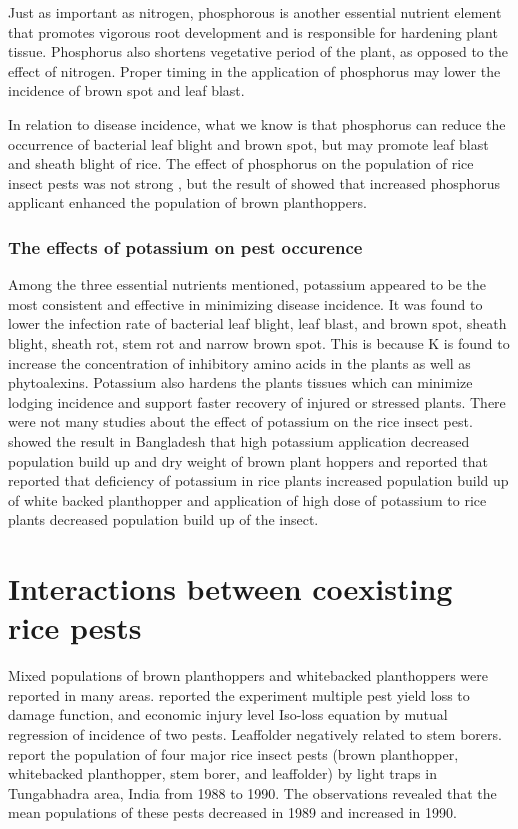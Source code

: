 \documentclass[12pt, oneside]{report}
\begin{document}
Just as important as nitrogen, phosphorous is another essential nutrient element that promotes vigorous root development and is responsible for hardening plant tissue. Phosphorus also shortens vegetative period of the plant, as opposed to the effect of nitrogen. Proper timing in the application of phosphorus may lower the incidence of brown spot and leaf blast. 

In relation to disease incidence, what we know is that phosphorus can reduce the occurrence of bacterial leaf blight and brown spot, but may promote leaf blast and sheath blight of rice. The effect of phosphorus on the population of rice insect pests was not strong \citep{chau2003impacts, rashid2014effect}, but the result of \cite{rashid2014effect} showed that increased phosphorus applicant enhanced the population of brown planthoppers.

\subsubsection{The effects of potassium on pest occurence}

Among the three essential nutrients mentioned, potassium appeared to be the most consistent and effective in minimizing disease incidence. It was found to lower the infection rate of bacterial leaf blight, leaf blast, and brown spot, sheath blight, sheath rot, stem rot and narrow brown spot. This is because K is found to increase the concentration of inhibitory amino acids in the plants as well as phytoalexins. Potassium also hardens the plants tissues which can minimize lodging incidence and support faster recovery of injured or stressed plants. There were not many studies about the effect of potassium on the rice insect pest. \cite{rashid2014effect} showed the result in Bangladesh that high potassium application decreased population build up and dry weight of brown plant hoppers and \cite{salim2002effects} reported that reported that deficiency of potassium in rice plants increased population build up of white backed planthopper and application of high dose of potassium to rice plants decreased population build up of the insect.

\section*{Interactions between coexisting rice pests}

Mixed populations of brown planthoppers and whitebacked planthoppers were reported in many areas. \cite{naganagoud2010studies} reported the experiment multiple pest yield loss to damage function, and economic injury level Iso-loss equation by mutual regression of incidence of two pests. Leaffolder negatively related to stem borers. \cite{selvaraj2012determination} report the population of four major rice insect pests (brown planthopper, whitebacked planthopper, stem borer, and leaffolder) by light traps in Tungabhadra area, India from 1988 to 1990. The observations revealed that the mean populations of these pests decreased in 1989 and increased in 1990.
\end{document}
